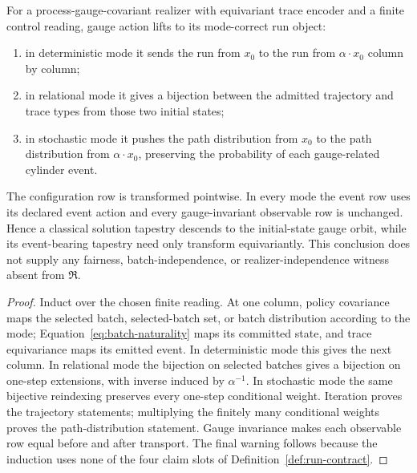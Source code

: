 \begin{proposition}
\label{prop:gauge-run-covariance}
For a process-gauge-covariant realizer with equivariant trace encoder and a
finite control reading, gauge action lifts to its mode-correct run object:
\begin{enumerate}[label=\textup{(\roman*)},leftmargin=2.5em]
\item in deterministic mode it sends the run from $x_0$ to the run from
$\alpha\cdot x_0$ column by column;
\item in relational mode it gives a bijection between the admitted trajectory
and trace types from those two initial states;
\item in stochastic mode it pushes the path distribution from $x_0$ to the
path distribution from $\alpha\cdot x_0$, preserving the probability of each
gauge-related cylinder event.
\end{enumerate}
The configuration row is transformed pointwise.  In every mode
the event row uses its declared event action and every gauge-invariant
observable row is unchanged.  Hence a classical solution tapestry descends to
the initial-state gauge orbit, while its event-bearing tapestry need only
transform equivariantly.  This conclusion does not supply any fairness,
batch-independence, or realizer-independence witness absent from
$\mathfrak R$.
\end{proposition}

\begin{proof}
Induct over the chosen finite reading.  At one column, policy covariance maps
the selected batch, selected-batch set, or batch distribution according to the
mode; Equation~\eqref{eq:batch-naturality} maps its committed state, and trace
equivariance maps its emitted event.  In deterministic mode this gives the
next column.  In relational mode the bijection on selected batches gives a
bijection on one-step extensions, with inverse induced by $\alpha^{-1}$.  In
stochastic mode the same bijective reindexing preserves every one-step
conditional weight.  Iteration proves the trajectory statements; multiplying
the finitely many conditional weights proves the path-distribution statement.
Gauge invariance makes each observable row equal before and after transport.
The final warning follows because the induction uses none of the four claim
slots of Definition~\ref{def:run-contract}.
\end{proof}

